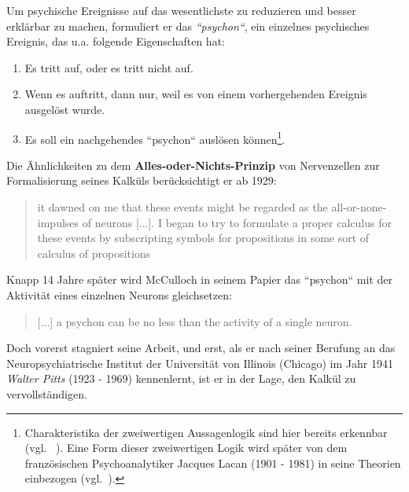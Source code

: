 Um psychische Ereignisse auf das wesentlichste zu reduzieren und besser erklärbar zu machen, formuliert er das \textit{``psychon``}, ein einzelnes psychisches Ereignis, das u.a. folgende Eigenschaften hat:

\begin{enumerate}
    \item Es tritt auf, oder es tritt nicht auf.
    \item Wenn es auftritt, dann nur, weil es von einem vorhergehenden Ereignis ausgelöst wurde.
    \item Es soll ein nachgehendes ``psychon`` auslösen können\footnote{
        Charakteristika der zweiwertigen Aussagenlogik sind hier bereits erkennbar (vgl. ~\cite[7]{Abr02}). Eine Form dieser zweiwertigen Logik wird später von dem französischen Psychoanalytiker Jacques Lacan (1901 - 1981) in seine Theorien einbezogen (vgl.~\cite[317]{Liu10}).
    }.
\end{enumerate}


Die Ähnlichkeiten zu dem \textbf{Alles-oder-Nichts-Prinzip} von Nervenzellen zur Formalisierung seines Kalküls berücksichtigt er ab 1929:

\blockquote[{\cite[6]{Mcc16}}]{
    it dawned on me that these events might be regarded as the all-or-none-impulses of neurons [...]. I began to try to formulate a proper calculus for these events by subscripting symbols for propositions in some sort of calculus of propositions
}

Knapp 14 Jahre später wird McCulloch in seinem Papier das ``psychon`` mit der Aktivität eines einzelnen Neurons gleichsetzen:

\blockquote[{\cite[114]{MP43}}]{
    [...] a psychon can be no less than the activity of a single neuron.
}

Doch vorerst stagniert seine Arbeit, und erst, als er nach seiner Berufung an das Neuropsychiatrische Institut der Universität von Illinois (Chicago) im Jahr 1941 \textit{Walter Pitts} (1923 - 1969) kennenlernt, ist er in der Lage, den Kalkül zu vervollständigen.\\

